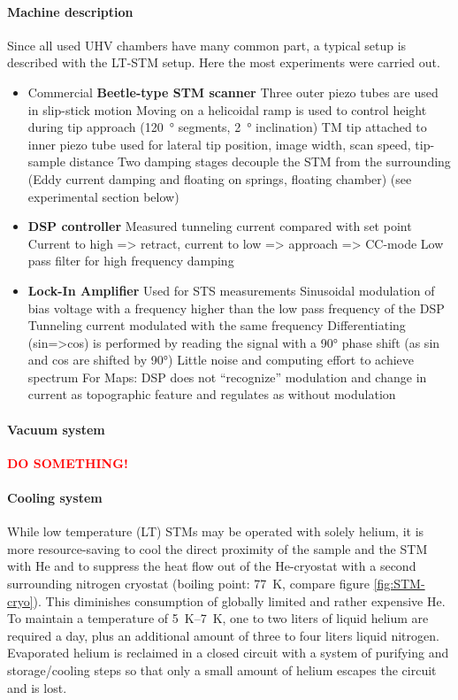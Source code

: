 \paragraph{Machine description}
Since all used UHV chambers have many common part, a typical setup is described with the LT-STM setup. Here the most experiments were carried out.
\begin{itemize}
	\item Commercial \textbf{Beetle-type STM scanner} \cite{zoephel_aufbau_2000}
	\subitem Three outer piezo tubes are used in slip-stick motion
	\subitem Moving on a helicoidal ramp is used to control height during tip approach (\SI{120}{\degree} segments, \SI{2}{\degree} inclination)
	\subitem TM tip attached to inner piezo tube used for lateral tip position, image width, scan speed, tip-sample distance
	\subitem Two damping stages decouple the STM from the surrounding (Eddy current damping and floating on springs, floating chamber) (see experimental section below)
	\item \textbf{DSP controller}
	\subitem Measured tunneling current compared with set point
	\subitem Current to high => retract, current to low => approach => CC-mode
	\subitem Low pass filter for high frequency damping
	\item \textbf{Lock-In Amplifier}
	\subitem Used for STS measurements
	\subitem Sinusoidal modulation of bias voltage with a frequency higher than the low pass frequency of the DSP 
	\subitem Tunneling current modulated with the same frequency
	\subitem Differentiating (sin=>cos) is performed by reading the signal with a 90° phase shift (as sin and cos are shifted by 90°)
	\subitem Little noise and computing effort to achieve spectrum
	\subitem For Maps: DSP does not “recognize” modulation and change in current as topographic feature and regulates as without modulation
\end{itemize}

\paragraph{Vacuum system}
\textcolor{red}{\textbf{DO SOMETHING!}}

\paragraph{Cooling system} 
While low temperature (LT) STMs may be operated with solely helium, it is more resource-saving to cool the direct proximity of the sample and the STM with He and to suppress the heat flow out of the He-cryostat with a second surrounding nitrogen cryostat (boiling point: \SI{77}{\K}, compare figure \ref{fig:STM-cryo}). This diminishes consumption of globally limited and rather expensive He. To maintain a temperature of \SIrange{5}{7}{\K}, one to two liters of liquid helium are required a day, plus an additional amount of three to four liters liquid nitrogen. Evaporated helium is reclaimed in a closed circuit with a system of purifying and storage/cooling steps so that only a small amount of helium escapes the circuit and is lost.

